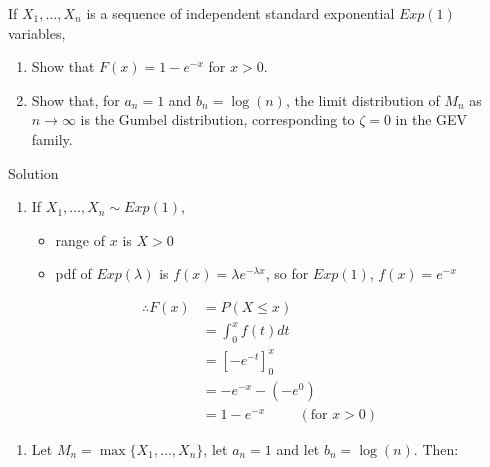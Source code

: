 \documentclass[
  letterpaper,
  DIV=11,
  numbers=noendperiod,
  oneside]{scrartcl}
\providecommand{\tightlist}{%
  \setlength{\itemsep}{0pt}\setlength{\parskip}{0pt}}\usepackage{longtable,booktabs,array}
\begin{document}
\begin{tcolorbox}[enhanced jigsaw, colframe=quarto-callout-warning-color-frame, toptitle=1mm, toprule=.15mm, bottomtitle=1mm, titlerule=0mm, coltitle=black, left=2mm, rightrule=.15mm, arc=.35mm, colback=white, title={Task 8}, breakable, opacitybacktitle=0.6, opacityback=0, bottomrule=.15mm, leftrule=.75mm, colbacktitle=quarto-callout-warning-color!10!white]

If \(X_1, \dots, X_n\) is a sequence of independent standard exponential
\(Exp(1)\) variables,

\begin{enumerate}
\def\labelenumi{(\alph{enumi})}
\tightlist
\item
  Show that \(F(x)= 1-e^{-x}\) for \(x> 0\).
\item
  Show that, for \(a_n=1\) and \(b_n=\log(n)\), the limit distribution
  of \(M_n\) as \(n \rightarrow \infty\) is the Gumbel distribution,
  corresponding to \(\zeta = 0\) in the GEV family.
\end{enumerate}

Solution

\begin{enumerate}
\def\labelenumi{(\alph{enumi})}
\item
  If \(X_1, \dots, X_n \sim Exp(1)\),

  \begin{itemize}
  \tightlist
  \item
    range of \(x\) is \(X>0\)
  \item
    pdf of \(Exp(\lambda)\) is \(f(x) = \lambda e^{-\lambda x}\), so for
    \(Exp(1)\), \(f(x) = e^{-x}\)
  \end{itemize}
\end{enumerate}

\[\begin{split}\therefore F(x) &= P(X \leq x)\\ &= \int_0^x f(t) dt\\ &= [-e^{-t}]_0^x\\ &= -e^{-x} - (-e^0)\\ &= 1 - e^{-x} \hspace{1cm} (\text{for } x>0)\end{split}\]

\begin{enumerate}
\def\labelenumi{(\alph{enumi})}
\setcounter{enumi}{1}
\tightlist
\item
  Let \(M_n = \max\{X_1, \dots, X_n\}\), let \(a_n = 1\) and let
  \(b_n = \log(n)\). Then:
\end{enumerate}


\end{tcolorbox}
\end{document}
